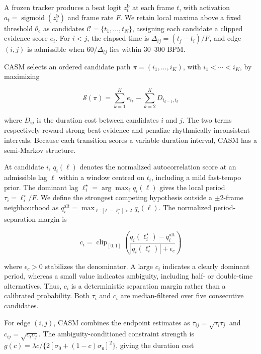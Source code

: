 \documentclass{article}
\newif\ifshowchanges
\newcommand{\rev}[1]{%
  \ifshowchanges
    \textcolor{red}{#1}%
  \else
    #1%
  \fi
}
\begin{document}
\rev{A frozen tracker produces a beat logit $z_t^{\mathrm b}$ at each
frame $t$, with activation
$a_t=\operatorname{sigmoid}(z_t^{\mathrm b})$ and frame rate $F$.
We retain local maxima above a fixed threshold $\theta_{\mathrm c}$ as
candidates $\mathcal C=\{t_1,\ldots,t_N\}$, assigning each candidate a
clipped evidence score $e_i$. For $i<j$, the elapsed time is
$\Delta_{ij}=(t_j-t_i)/F$, and edge $(i,j)$ is admissible when
$60/\Delta_{ij}$ lies within 30--300 BPM.}

\rev{CASM selects an ordered candidate path
$\pi=(i_1,\ldots,i_K)$, with $i_1<\cdots<i_K$, by maximizing}

\begin{equation}
\rev{
\mathcal S(\pi)
=
\sum_{k=1}^{K} e_{i_k}
-
\sum_{k=2}^{K}D_{i_{k-1},i_k}
}
\label{eq:casm-objective}
\end{equation}

\rev{where $D_{ij}$ is the duration cost between candidates $i$ and $j$.
The two terms respectively reward strong beat evidence and penalize
rhythmically inconsistent intervals. Because each transition scores a
variable-duration interval, CASM has a semi-Markov structure.}

\rev{At candidate $i$, $q_i(\ell)$ denotes the normalized
autocorrelation score at an admissible lag $\ell$ within a window
centred on $t_i$, including a mild fast-tempo prior. The dominant lag
$\ell_i^\star=\arg\max_\ell q_i(\ell)$ gives the local period
$\tau_i=\ell_i^\star/F$. We define the strongest competing hypothesis
outside a $\pm2$-frame neighbourhood as
$q_i^{\mathrm{alt}}
=\max_{\ell:\,|\ell-\ell_i^\star|>2}q_i(\ell)$.
The normalized period-separation margin is}

\begin{equation}
\rev{
c_i =
\operatorname{clip}_{[0,1]}\!\left(
\frac{
q_i(\ell_i^\star)-q_i^{\mathrm{alt}}
}{
|q_i(\ell_i^\star)|+\epsilon_c
}
\right)
}
\label{eq:casm-reliability}
\end{equation}

\rev{where $\epsilon_c>0$ stabilizes the denominator. A large $c_i$
indicates a clearly dominant period, whereas a small value indicates
ambiguity, including half- or double-time alternatives. Thus, $c_i$ is
a deterministic separation margin rather than a calibrated
probability. Both $\tau_i$ and $c_i$ are median-filtered over five
consecutive candidates.}

\rev{For edge $(i,j)$, CASM combines the endpoint estimates as
$\bar{\tau}_{ij}=\sqrt{\tau_i\tau_j}$ and
$c_{ij}=\sqrt{c_i c_j}$. The ambiguity-conditioned constraint strength
is
$g(c)=\lambda c/\{2[\sigma_0+(1-c)\sigma_{\mathrm u}]^2\}$,
giving the duration cost}
\end{document}
